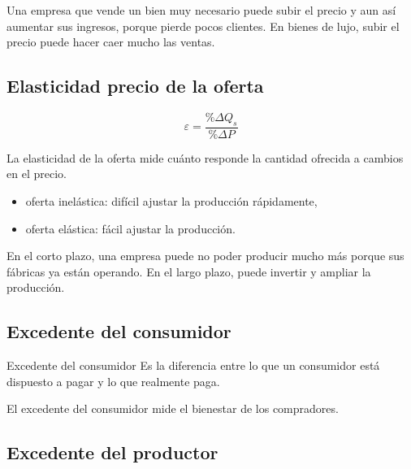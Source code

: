 \begin{ejemplo}
Una empresa que vende un bien muy necesario puede subir el precio y aun así aumentar sus ingresos, porque pierde pocos clientes. En bienes de lujo, subir el precio puede hacer caer mucho las ventas.
\end{ejemplo}

\subsection{Elasticidad precio de la oferta}

\begin{equation}
\varepsilon = \frac{\%\Delta Q_s}{\%\Delta P}
\end{equation}

La elasticidad de la oferta mide cuánto responde la cantidad ofrecida a cambios en el precio.

\begin{itemize}
    \item oferta inelástica: difícil ajustar la producción rápidamente,
    \item oferta elástica: fácil ajustar la producción.
\end{itemize}

\begin{ejemplo}
En el corto plazo, una empresa puede no poder producir mucho más porque sus fábricas ya están operando. En el largo plazo, puede invertir y ampliar la producción.
\end{ejemplo}

\subsection{Excedente del consumidor}

\begin{concepto}{Excedente del consumidor}
Es la diferencia entre lo que un consumidor está dispuesto a pagar y lo que realmente paga.
\end{concepto}

El excedente del consumidor mide el bienestar de los compradores.


\subsection{Excedente del productor}

